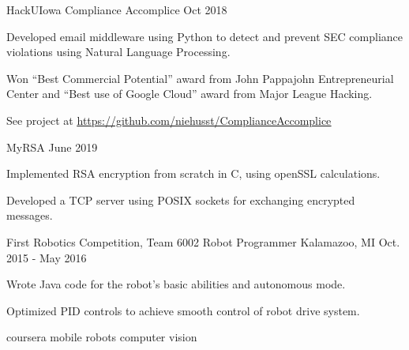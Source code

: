 \documentclass[12pt, a4paper]{awesome-cv}
\begin{document}
\begin{cventries}

    \cventry
	{HackUIowa}
 	{Compliance Accomplice}
	{Oct 2018}
	{}
	{
	  \begin{cvitems}
	     \item{Developed email middleware using Python to detect and prevent SEC compliance violations using Natural Language Processing.}
	     \item{Won “Best Commercial Potential” award from John Pappajohn Entrepreneurial Center and “Best use of Google Cloud” award from Major League Hacking.}
	     \item{See project at \underline{\href{https://github.com/niehusst/ComplianceAccomplice}{https://github.com/niehusst/ComplianceAccomplice}}}
	  \end{cvitems}
	}

  \cventry
    {}
    {MyRSA}
    {June 2019}
    {}
    {
	\begin{cvitems}
	    \item{Implemented RSA encryption from scratch in C, using openSSL calculations.}
	    \item{Developed a TCP server using POSIX sockets for exchanging encrypted messages.}
	\end{cvitems}
    }

  \cventry
    {First Robotics Competition, Team 6002}
    {Robot Programmer}
    {Kalamazoo, MI}
    {Oct. 2015 - May 2016}
    {
      \begin{cvitems}
        \item {Wrote Java code for the robot’s basic abilities and autonomous mode.}
	       \item {Optimized PID controls to achieve smooth control of robot drive system.}
      \end{cvitems}
    }

\end{cventries}


\begin{cventries}

coursera mobile robots
computer vision

\end{cventries}
\end{document}

